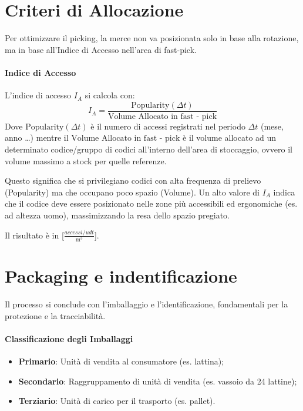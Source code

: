 %
\section{Criteri di Allocazione}
Per ottimizzare il picking, la merce non va posizionata solo in base alla rotazione, ma in base all'Indice di Accesso nell'area di fast-pick.
%
\paragraph{Indice di Accesso} L'indice di accesso $ I_{A} $ si calcola con:
\[
    I_{A} = \frac{\text{Popularity}(\Delta t)}{\text{Volume Allocato in fast - pick}}
\]
Dove $ \text{Popularity}(\Delta t) $ è il numero di accessi registrati nel periodo $ \Delta t $ (mese, anno \dots) mentre il $ \text{Volume Allocato in fast - pick} $ è il volume allocato ad un determinato codice/gruppo di codici all'interno dell'area di stoccaggio, ovvero il volume massimo a stock per quelle referenze.

Questo significa che si privilegiano codici con alta frequenza di prelievo (Popularity) ma che occupano poco spazio (Volume). Un alto valore di $I_A$ indica che il codice deve essere posizionato nelle zone più accessibili ed ergonomiche (es. ad altezza uomo), massimizzando la resa dello spazio pregiato.

Il risultato è in [$ \frac{\si{accessi \per udt}}{\si{\m^3}} $].

%
\section{Packaging e indentificazione}
Il processo si conclude con l'imballaggio e l'identificazione, fondamentali per la protezione e la tracciabilità.
%
\paragraph{Classificazione degli Imballaggi}
\begin{itemize}
    \item \textbf{Primario}: Unità di vendita al consumatore (es. lattina);
    \item \textbf{Secondario}: Raggruppamento di unità di vendita (es. vassoio da 24 lattine);
    \item \textbf{Terziario}: Unità di carico per il trasporto (es. pallet).
\end{itemize}

%
